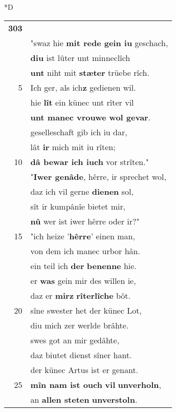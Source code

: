 \documentclass[8pt,a4paper,notitlepage]{article}
\begin{document}
\begin{table}[ht]
\begin{minipage}[t]{0.5\linewidth}
\small
\begin{center}*D
\end{center}
\begin{tabular}{rl}
\textbf{303} & \textbf{\begin{large}M\end{large}în hêr Gawan} \textbf{dô} sprach:\\ 
 & "swaz hie \textbf{mit rede gein iu} geschach,\\ 
 & \textbf{diu} ist lûter unt minneclîch\\ 
 & \textbf{unt} niht mit \textbf{stæter} trüebe rîch.\\ 
5 & Ich ger, als ich\textbf{z} gedienen wil.\\ 
 & hie \textbf{lît} ein künec unt rîter vil\\ 
 & \textbf{unt manec vrouwe wol gevar}.\\ 
 & geselleschaft gib ich iu dar,\\ 
 & lât \textbf{ir} mich mit iu rîten;\\ 
10 & \textbf{dâ bewar ich iuch} vor strîten."\\ 
 & "\textbf{Iwer genâde}, hêrre, ir sprechet wol,\\ 
 & daz ich vil gerne \textbf{dienen} sol,\\ 
 & sît ir kumpânîe bietet mir,\\ 
 & \textbf{nû} wer ist iwer hêrre oder ir?"\\ 
15 & "ich heize '\textbf{hêrre}' einen man,\\ 
 & von dem ich manec urbor hân.\\ 
 & ein teil ich \textbf{der} \textbf{benenne} hie.\\ 
 & er \textbf{was} gein mir des willen ie,\\ 
 & daz er \textbf{mirz} \textbf{rîterlîche} bôt.\\ 
20 & sîne swester het der künec Lot,\\ 
 & diu mich zer werlde brâhte.\\ 
 & swes got an mir gedâhte,\\ 
 & daz biutet dienst sîner hant.\\ 
 & der künec Artus ist er genant.\\ 
25 & \textbf{mîn nam ist ouch} \textbf{vil} \textbf{unverholn},\\ 
 & an \textbf{allen steten} \textbf{unverstoln}.\\ 

\end{tabular}
\end{minipage}
\end{table}
\end{document}

